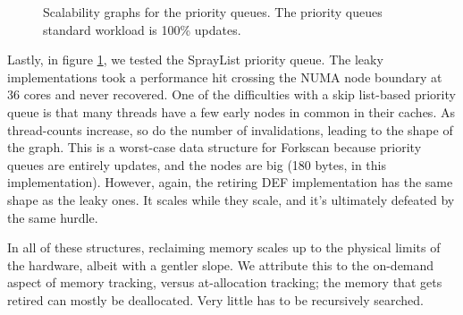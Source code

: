 \begin{figure}[tbp]
  \centering
  \caption{Scalability graphs for the priority queues. The priority queues standard workload is 100\% updates.}
  \label{fig:priorityqueues}
\end{figure}

Lastly, in figure \ref{fig:priorityqueues}, we tested the SprayList priority queue.  The leaky implementations took a performance hit crossing the NUMA node boundary at 36 cores and never recovered.  One of the difficulties with a skip list-based priority queue is that many threads have a few early nodes in common in their caches.  As thread-counts increase, so do the number of invalidations, leading to the shape of the graph.  This is a worst-case data structure for Forkscan because priority queues are entirely updates, and the nodes are big (180 bytes, in this implementation).  However, again, the retiring DEF implementation has the same shape as the leaky ones.  It scales while they scale, and it's ultimately defeated by the same hurdle.

In all of these structures, reclaiming memory scales up to the physical limits of the hardware, albeit with a gentler slope.  We attribute this to the on-demand aspect of memory tracking, versus at-allocation tracking; the memory that gets retired can mostly be deallocated.  Very little has to be recursively searched.

